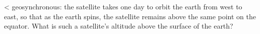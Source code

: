 <%
geosynchronous: the satellite takes one day to orbit the
earth from west to east, so that as the earth spins, the
satellite remains above the same point on the equator. What
is such a satellite's altitude above the surface of the earth?
